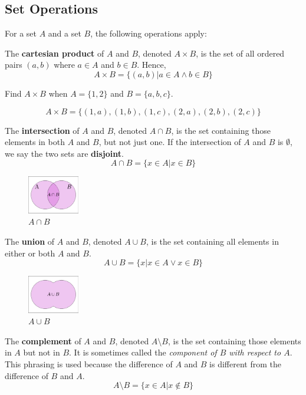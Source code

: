 \subsection{Set Operations}

For a set $A$ and a set $B$, the following operations apply:

The \textbf{cartesian product} of $A$ and $B$, denoted $A \times B$, is the set of all ordered pairs $(a, b)$ where $a \in A$ and $b \in B$. Hence,
\[ A \times B = \big\{ (a,b) | a \in A \land b \in B \big\} \]

\begin{ex}
  Find $A \times B$ when $A = \{ 1,2 \} $ and $B = \{ a, b, c\} $.
  \begin{sol}
    \[A \times B = \big\{(1,a),(1,b),(1,c),
    (2,a),(2,b),(2,c)\big\}\]
  \end{sol}
\end{ex}

The \textbf{intersection} of $A$ and $B$, denoted $A \cap B$,
is the set containing those elements in both $A$ and $B$, but not just one.
If the intersection of $A$ and $B$ is $\emptyset$, we say the two sets are \textbf{disjoint}.
\[ A \cap B = \big\{ x \in A | x \in B \big\}\]
\begin{figure}[H]
  \begin{center}
    \includegraphics[width=0.2\textwidth]{discrete/sets/intersection.eps}
  \end{center}
  \caption{$A\cap B$}
\end{figure}The \textbf{union} of $A$ and $B$, denoted $A \cup B$,
is the set containing all elements in either or both $A$ and $B$.
\[ A \cup B = \big\{ x | x \in A \lor x \in B \big\}\]
\begin{figure}[H]
  \begin{center}
    \includegraphics[width=0.2\textwidth]{discrete/sets/union.eps}
  \end{center}
  \caption{$A \cup B$}
\end{figure}
The \textbf{complement} of $A$ and $B$, denoted $A \setminus B$,
is the set containing those elements in $A$ but not in $B$.
It is sometimes called the \emph{component of $B$ with respect to $A$}.
This phrasing is used because the difference of $A$ and $B$ is different from the difference of $B$ and $A$.
\[ A \setminus B = \big\{ x \in A \big| x \not\in B \big\} \]

